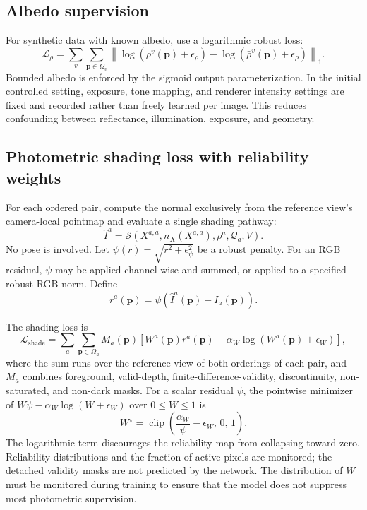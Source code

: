 \documentclass[11pt,a4paper]{article}
\newcommand{\clip}{\operatorname{clip}}
\newcommand{\Sshade}{\mathcal{S}}
\newcommand{\Loss}{\mathcal{L}}
\begin{document}
\subsection{Albedo supervision}

For synthetic data with known albedo, use a logarithmic robust loss:
\[
  \Loss_\rho
  =
  \sum_v\sum_{\bm p\in\Omega_v}
  \left\|
    \log(\rho^v(\bm p)+\epsilon_\rho)
    -
    \log(\bar\rho^v(\bm p)+\epsilon_\rho)
  \right\|_1.
\]
Bounded albedo is enforced by the sigmoid output parameterization. In the initial
controlled setting, exposure, tone mapping, and renderer intensity settings
are fixed and recorded rather than freely learned per image. This reduces
confounding between reflectance, illumination, exposure, and geometry.

\subsection{Photometric shading loss with reliability weights}

For each ordered pair, compute the normal exclusively from the reference
view's camera-local pointmap and evaluate a single shading pathway:
\[
  \widehat I^a
  =
  \Sshade
  \left(
    X^{a,a},
    n_X(X^{a,a}),
    \rho^a,
    \mathcal Q_a,
    V
  \right).
\]
No pose is involved. Let $\psi(r)=\sqrt{r^2+\epsilon_\psi^2}$ be a robust penalty. For an RGB
residual, $\psi$ may be applied channel-wise and summed, or applied to a
specified robust RGB norm. Define
\[
  r^a(\bm p)
  =
  \psi\!\left(
    \widehat I^a(\bm p)-I_a(\bm p)
  \right).
\]

The shading loss is
\[
  \boxed{
  \Loss_{\mathrm{shade}}
  =
  \sum_{a}\sum_{\bm p\in\Omega_a}
  M_a(\bm p)
  \left[
    W^a(\bm p)r^a(\bm p)
    -
    \alpha_W\log(W^a(\bm p)+\epsilon_W)
  \right],
  }
\]
where the sum runs over the reference view of both orderings of each pair, and $M_a$ combines foreground, valid-depth,
finite-difference-validity, discontinuity, non-saturated, and non-dark masks. For a scalar residual $\psi$, the pointwise minimizer
of $W\psi-\alpha_W\log(W+\epsilon_W)$ over $0\leq W\leq1$ is
\[
  W^\star
  =
  \clip\!\left(\frac{\alpha_W}{\psi}-\epsilon_W,\,0,\,1\right).
\]
The logarithmic term discourages the reliability map from collapsing
toward zero. Reliability distributions and the fraction of active pixels
are monitored; the detached validity masks are not predicted by the network. The distribution of $W$ must be monitored during training to ensure
that the model does not suppress most photometric supervision.
\end{document}
